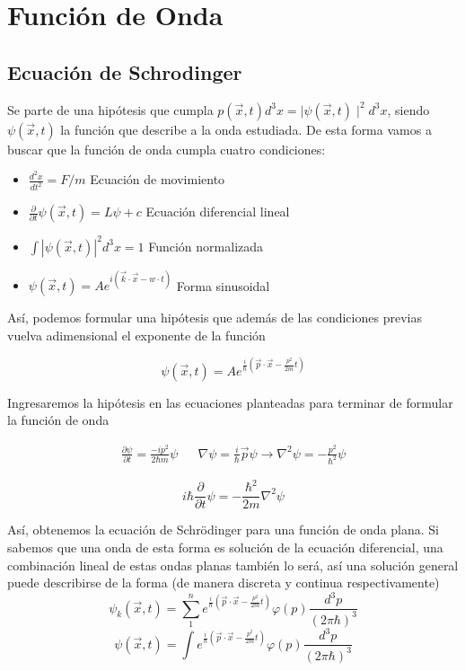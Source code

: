 \documentclass[a4,12pt]{aleph-notas}
\begin{document}
\encabezado

\section{Función de Onda}
\subsection{Ecuación de Schrodinger}
Se parte de una hipótesis que cumpla $p(\vec{x},t)d^3x=\mid \psi(\vec{x},t)\mid^2d^3x$, siendo $\psi(\vec{x},t)$ la función que describe a la onda estudiada. De esta forma vamos a buscar que la función de onda cumpla cuatro condiciones:\\
\begin{itemize}
    \item $\frac{d^2x}{dt^2}=F/m$ Ecuación de movimiento \item $\frac{\partial}{\partial t} \psi(\vec{x},t)=L\psi+c$ Ecuación diferencial lineal \item $\int \left\lvert \psi(\vec{x},t) \right\rvert^2 d^3x=1 $ Función normalizada \item $\psi( \vec{x},t)=Ae^{i(\vec{k}\cdot \vec{x}-w\cdot t)}$ Forma sinusoidal
\end{itemize}

Así, podemos formular una hipótesis que además de las condiciones previas vuelva adimensional el exponente de la función

\begin{equation*}
    \psi(\vec{x},t)=Ae^{\frac{i}{\hbar}\left( \vec{p} \cdot \vec{x}- \frac{p^2}{2m}t\right)}
\end{equation*}

Ingresaremos la hipótesis en las ecuaciones planteadas para terminar de formular la función de onda

\begin{align*}
    \frac{\partial \psi}{\partial t}=\frac{-ip^2}{2\hbar m} \psi && \nabla\psi=\frac{i}{\hbar}\vec{p}\psi \rightarrow \nabla^2\psi=-\frac{p^2}{\hbar^2}\psi
\end{align*}

\begin{equation}\label{Schrodinger}
    i\hbar\frac{\partial}{\partial t} \psi=-\frac{\hbar^2}{2m}\nabla^2\psi
\end{equation}

Así, obtenemos la ecuación de Schrödinger para una función de onda plana. Si sabemos que una onda de esta forma es solución de la ecuación diferencial, una combinación lineal de estas ondas planas también lo será, así una solución general puede describirse de la forma (de manera discreta y continua respectivamente)
    $$\psi_k(\vec{x},t)=\sum_{1}^{n}e^{\frac{i}{\hbar}\left(\vec{p}\cdot\vec{x}-\frac{p^2}{2m}t\right)}\varphi(p)\frac{d^3 p}{(2 \pi \hbar)^3}$$
\begin{equation}\label{Superposition}
    \psi(\vec{x},t)=\int e^{\frac{i}{\hbar}\left(\vec{p}\cdot\vec{x}-\frac{p^2}{2m}t\right)}\varphi(p)\frac{d^3 p}{(2 \pi \hbar)^3}
\end{equation}
\end{document}
